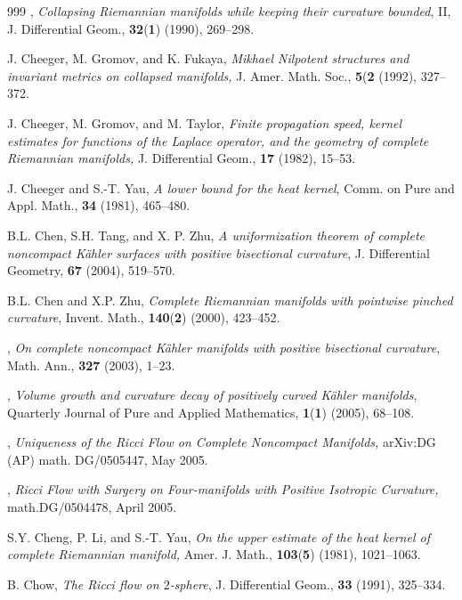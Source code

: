 \begin{thebibliography}{999}
 \bysame,
{\it Collapsing Riemannian manifolds while keeping their curvature
bounded}, II, J. Differential Geom., \textbf{32}({\bf 1}) (1990),
269--298.

 J. Cheeger, M. Gromov, and K. Fukaya,
{\it  Mikhael Nilpotent structures and invariant metrics on
collapsed manifolds,} J. Amer. Math. Soc., \textbf{5}({\bf 2}
(1992), 327--372.

 J. Cheeger, M. Gromov, and M. Taylor,
{\it Finite propagation speed, kernel estimates for functions of
the Laplace operator, and the geometry of complete Riemannian
manifolds,} J. Differential Geom., {\bf 17} (1982), 15--53.

J. Cheeger and S.-T. Yau,
{\it A lower bound for the heat kernel}, Comm. on Pure and Appl.
Math.,\textbf{ 34} (1981), 465--480.

B.L. Chen, S.H. Tang, and X. P. Zhu,
{\it A uniformization theorem of complete noncompact K\"ahler
surfaces with positive bisectional curvature}, J. Differential
Geometry, {\bf 67} (2004), 519--570.

B.L. Chen and X.P. Zhu,
{\it Complete Riemannian manifolds with pointwise pinched
curvature}, Invent. Math., \textbf{140}({\bf 2}) (2000), 423--452.

 \bysame,
{\it On complete noncompact K\"ahler manifolds with positive
bisectional curvature}, Math. Ann., {\bf 327} (2003), 1--23.

 \bysame,
{\it Volume growth and curvature decay of positively curved
K\"ahler manifolds}, Quarterly Journal of Pure and Applied
Mathematics, \textbf{1}({\bf 1}) (2005), 68--108.

  \bysame,
{\it Uniqueness of the Ricci Flow on Complete Noncompact
Manifolds,} arXiv:DG (AP) math. DG/0505447, May 2005.

  \bysame,
{\it Ricci Flow with Surgery on Four-manifolds with Positive
Isotropic Curvature,} math.DG/0504478, April 2005.

S.Y. Cheng, P. Li, and S.-T. Yau,
{\it On the upper estimate of the heat kernel of complete
Riemannian manifold,} Amer. J. Math., {\bf 103}({\bf 5}) (1981),
1021--1063.

B. Chow,
{\it The Ricci flow on $2$-sphere}, J. Differential Geom., {\bf
33} (1991), 325--334.


\end{thebibliography}
